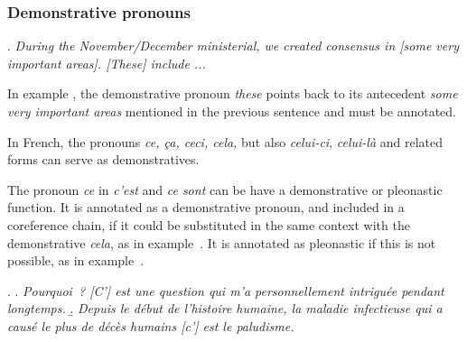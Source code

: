 \documentclass[a4paper]{article}
\begin{document}

% 
% 

\subsubsection{Demonstrative pronouns}

\ex.
{\sl During the November/December ministerial, we created consensus in [some very important areas]. [These] include ...}

In example \Last, the demonstrative pronoun {\sl these} points back to its antecedent {\sl some very important areas} mentioned in the previous sentence and must be annotated. 

In French, the pronouns \textsl{ce, ça, ceci, cela,} but also \textsl{celui-ci},
\textsl{celui-là} and related forms can serve as demonstratives.

The pronoun \textsl{ce} in \textsl{c'est} and \textsl{ce sont} can be have a
demonstrative or pleonastic function. It is annotated as a demonstrative
pronoun, and included in a coreference chain, if it could be substituted in the
same context with the demonstrative \textsl{cela}, as in example~\Next[a]. It
is annotated as pleonastic if this is not possible, as in example~\Next[b].

\ex.
\a. \textsl{Pourquoi~? [C'] est une question qui m'a personnellement intriguée pendant longtemps.}
\b. \textsl{Depuis le début de l'histoire humaine, la maladie infectieuse qui a causé le plus de décès humains
[c'] est le paludisme.}
\end{document}
